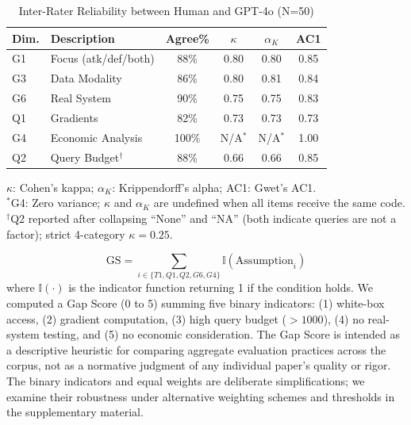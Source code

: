 \documentclass[runningheads]{llncs}
\begin{document}
\begin{table}[htbp]
\centering
\caption{Inter-Rater Reliability between Human and GPT-4o (N=50)}
\label{tab:irr-main}
\begin{tabular}{@{}llcccc@{}}
\toprule
Dim. & Description & Agree\% & $\kappa$ & $\alpha_K$ & AC1 \\
\midrule
G1 & Focus (atk/def/both)      & 88\%  & 0.80          & 0.80          & 0.85 \\
G3 & Data Modality             & 86\%  & 0.80          & 0.81          & 0.84 \\
G6 & Real System               & 90\%  & 0.75          & 0.75          & 0.83 \\
Q1 & Gradients                 & 82\%  & 0.73          & 0.73          & 0.73 \\
G4 & Economic Analysis         & 100\% & N/A$^{*}$     & N/A$^{*}$     & 1.00 \\
Q2 & Query Budget$^{\dagger}$  & 88\%  & 0.66          & 0.66          & 0.85 \\
\bottomrule
\end{tabular}

\smallskip
{\footnotesize $\kappa$: Cohen's kappa; $\alpha_K$: Krippendorff's alpha; AC1: Gwet's AC1.\\
$^{*}$G4: Zero variance; $\kappa$ and $\alpha_K$ are undefined when all items receive the same code.\\
$^{\dagger}$Q2 reported after collapsing ``None'' and ``NA'' (both indicate queries are not a factor); strict 4-category $\kappa = 0.25$.}
\end{table}

\begin{equation}
\mathrm{GS} = \sum_{i \in \{T1, Q1, Q2, G6, G4\}} \mathbb{I}(\mathrm{Assumption}_i)
\label{eq:gapscore}
\end{equation}
where $\mathbb{I}(\cdot)$ is the indicator function returning 1 if the condition holds. We computed a Gap Score (0 to 5) summing five binary indicators: (1) white-box access, (2) gradient computation, (3) high query budget ($> 1000$), (4) no real-system testing, and (5) no economic consideration. The Gap Score is intended as a descriptive heuristic for comparing aggregate evaluation practices across the corpus, not as a normative judgment of any individual paper's quality or rigor. The binary indicators and equal weights are deliberate simplifications; we examine their robustness under alternative weighting schemes and thresholds in the supplementary material.
\end{document}
